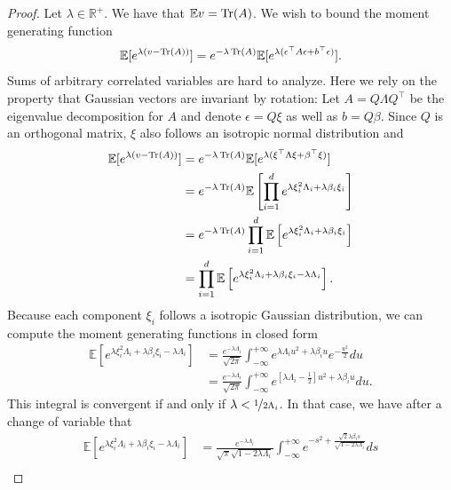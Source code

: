 \begin{proof}
    Let $\lambda \in \mathbb{R}^+$. We have that $\mathbb{E}v = \operatorname{Tr}(A)$. We wish to bound the moment generating function
    \begin{align}
        \mathbb{E}[e^{\lambda(v-\operatorname{Tr}(A))}] = e^{-\lambda \operatorname{Tr}(A)} \mathbb{E}[e^{\lambda(\epsilon^\top A\epsilon + b^\top \epsilon)}].
    \end{align}
    Sums of arbitrary correlated variables are hard to analyze.
    Here we rely on the property that Gaussian vectors are invariant by rotation: Let $A = Q\Lambda Q^\top $ be the eigenvalue decomposition for $A$ and denote $\epsilon = Q\xi$ as well as $b = Q\beta$. Since $Q$ is an orthogonal matrix, $\xi$ also follows an isotropic normal distribution and
    \begin{align}
        \mathbb{E}[e^{\lambda(v-\operatorname{Tr}(A))}] &= e^{-\lambda \operatorname{Tr}(A)} \mathbb{E}[e^{\lambda(\xi^\top \Lambda\xi + \beta^\top \xi)}] \\
        &= e^{-\lambda \operatorname{Tr}(A)} \mathbb{E}\left[ \prod_{i=1}^d e^{\lambda\xi_i^2\Lambda_i + \lambda \beta_i\xi_i}\right] \\
        &= e^{-\lambda \operatorname{Tr}(A)} \prod_{i=1}^d \mathbb{E} \left[e^{\lambda\xi_i^2\Lambda_i + \lambda \beta_i\xi_i}\right] \\
        &= \prod_{i=1}^d \mathbb{E} \left[e^{\lambda\xi_i^2\Lambda_i + \lambda \beta_i\xi_i - \lambda\Lambda_i}\right].
    \end{align}
    Because each component $\xi_i$ follows a isotropic Gaussian distribution, we can compute the moment generating functions in closed form
    \begin{align}
        \mathbb{E} \left[e^{\lambda\xi_i^2\Lambda_i + \lambda \beta_i\xi_i - \lambda\Lambda_i}\right] &= 
        \frac{e^{-\lambda\Lambda_i}}{\sqrt{2\pi}}\int_{-\infty}^{+\infty} e^{\lambda\Lambda_iu^2 + \lambda\beta_i u}e^{-\frac{u^2}{2}}du \\
        &=
        \frac{e^{-\lambda\Lambda_i}}{\sqrt{2\pi}}\int_{-\infty}^{+\infty} e^{[\lambda\Lambda_i -\frac{1}{2}]u^2 + \lambda\beta_i u}du.
    \end{align}
    This integral is convergent if and only if $\lambda < \nicefrac{1}{2\Lambda_i}$. In that case, we have after a change of variable that
    \begin{align}
        \mathbb{E} \left[e^{\lambda\xi_i^2\Lambda_i + \lambda \beta_i\xi_i - \lambda\Lambda_i}\right] &= 
        \frac{e^{-\lambda\Lambda_i}}{\sqrt{\pi}\sqrt{1 - 2\lambda\Lambda_i}}\int_{-\infty}^{+\infty} e^{-s^2 + \frac{\sqrt{2}\lambda\beta_i s}{\sqrt{1 - 2\lambda\Lambda_i}}}ds \\

\end{align}
\end{proof}

